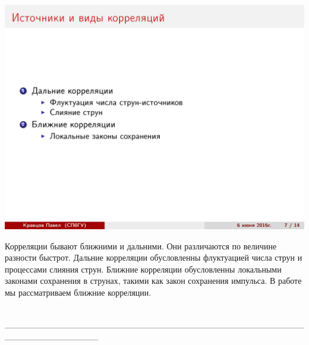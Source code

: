 \documentclass[14pt]{article}
\renewcommand{\line}{\\ \_\_\_\_\_\_\_\_\_\_\_\_\_\_\_\_\_\_\_\_\_\_\_\_\_\_\_\_\_\_\_\_\_\_\_\_\_\_\_\_\_\_\_\_\_\_\_\_\_\_\_\_\_\_\_\_\_\_\_\_\_\_\_ \\ }
\begin{document}
\begin{minipage}[h]{0.5\linewidth}
\includegraphics[width=1\linewidth]{page-07.jpg}
\end{minipage}
\begin{minipage}[h]{0.45\linewidth}
Корреляции бывают ближними и дальними. Они различаются по величине разности быстрот. Дальние корреляции обусловленны флуктуацией числа струн и процессами слияния струн. Ближние корреляции обусловленны локальными законами сохранения в струнах, такими как закон сохранения импульса. В работе мы рассматриваем ближние корреляции.
\end{minipage}
\line
\end{document}
